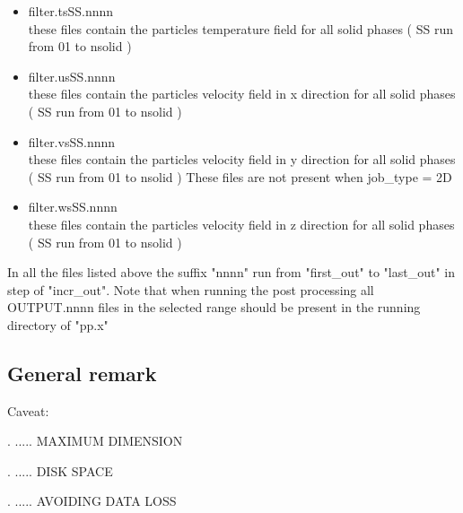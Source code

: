 \begin{itemize}
\item filter.tsSS.nnnn \\
      these files contain the particles temperature field 
      for all solid phases ( SS run from 01 to nsolid )

\item filter.usSS.nnnn \\
      these files contain the particles velocity field in x direction
      for all solid phases ( SS run from 01 to nsolid )

\item filter.vsSS.nnnn \\
      these files contain the particles velocity field in y direction
      for all solid phases ( SS run from 01 to nsolid )
      These files are not present when job\_type = 2D

\item filter.wsSS.nnnn \\
      these files contain the particles velocity field in z direction
      for all solid phases ( SS run from 01 to nsolid )


\end{itemize}

In all the files listed above the suffix "nnnn" run from
"first\_out" to "last\_out" in step of "incr\_out".
Note that when running the post processing all 
OUTPUT.nnnn files in the selected range should 
be present in the running directory of "pp.x"



\subsection{General remark}

\noindent Caveat:

. ..... MAXIMUM DIMENSION

. ..... DISK SPACE

. ..... AVOIDING DATA LOSS
